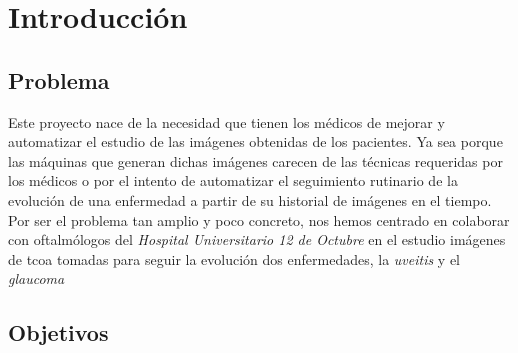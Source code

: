 \chapter{Introducción}
\section{Problema}
Este proyecto nace de la necesidad que tienen los médicos de mejorar y
automatizar el estudio de las imágenes obtenidas de los pacientes. Ya
sea porque las máquinas que generan dichas imágenes carecen de las
técnicas requeridas por los médicos o por el intento de automatizar el
seguimiento rutinario de la evolución de una enfermedad a partir de su
historial de imágenes en el tiempo. \\
Por ser el problema tan amplio y poco concreto, nos hemos
centrado en colaborar con oftalmólogos del \emph{Hospital
  Universitario 12 de Octubre} en el estudio imágenes de \gls{tcoa}
tomadas para seguir la evolución dos enfermedades, la \emph{uveitis} y el \emph{glaucoma}

\section{Objetivos}
